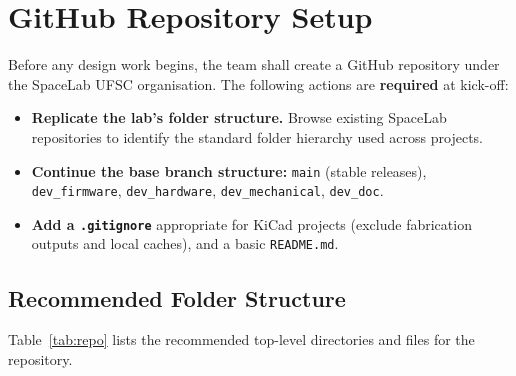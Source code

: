 %
%

\chapter{GitHub Repository Setup} \label{ch:repository}

Before any design work begins, the team shall create a GitHub repository under the SpaceLab UFSC organisation. The following actions are \textbf{required} at kick-off:

\begin{itemize}
    \item \textbf{Replicate the lab's folder structure.} Browse existing SpaceLab repositories to identify the standard folder hierarchy used across projects. 
    \item \textbf{Continue the base branch structure:} \texttt{main} (stable
        releases), \texttt{dev\_firmware}, \texttt{dev\_hardware},
        \texttt{dev\_mechanical}, \texttt{dev\_doc}.
    \item \textbf{Add a \texttt{.gitignore}} appropriate for KiCad projects (exclude fabrication outputs and local caches), and a basic \texttt{README.md}.
\end{itemize}

\section{Recommended Folder Structure}

Table~\ref{tab:repo} lists the recommended top-level directories and files for the repository.

